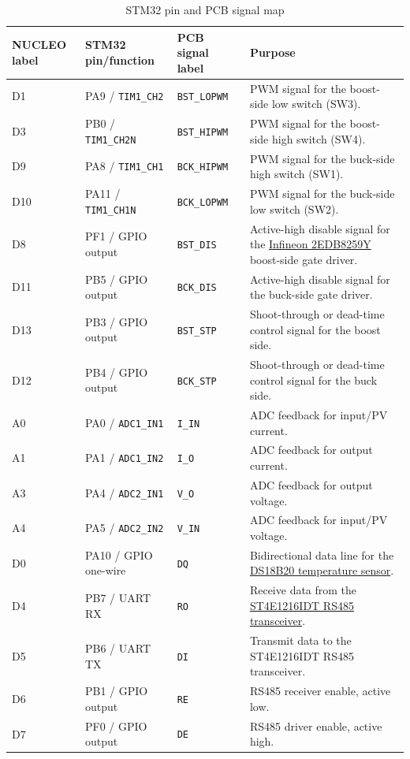 \documentclass[11pt,a4paper]{article}
\newcommand{\code}[1]{\texttt{#1}}
\begin{document}
\begin{table}[H]
  \centering
  \footnotesize
  \caption{STM32 pin and PCB signal map}
  \label{tab:firmware-interface}
  \begin{tabularx}{\textwidth}{@{}L{0.12\textwidth} L{0.21\textwidth} L{0.20\textwidth} Y@{}}
    \toprule
    \textbf{NUCLEO label} & \textbf{STM32 pin/function} & \textbf{PCB signal label} & \textbf{Purpose} \\
    \midrule
    D1  & PA9 / \code{TIM1\_CH2} & \code{BST\_LOPWM} & PWM signal for the boost-side low switch (SW3). \\
    D3  & PB0 / \code{TIM1\_CH2N} & \code{BST\_HIPWM} & PWM signal for the boost-side high switch (SW4). \\
    D9  & PA8 / \code{TIM1\_CH1} & \code{BCK\_HIPWM} & PWM signal for the buck-side high switch (SW1). \\
    D10 & PA11 / \code{TIM1\_CH1N} & \code{BCK\_LOPWM} & PWM signal for the buck-side low switch (SW2). \\
    D8  & PF1 / GPIO output & \code{BST\_DIS} & Active-high disable signal for the \href{https://www.infineon.com/part/2EDB8259Y}{Infineon 2EDB8259Y} boost-side gate driver. \\
    D11 & PB5 / GPIO output & \code{BCK\_DIS} & Active-high disable signal for the buck-side gate driver. \\
    D13 & PB3 / GPIO output & \code{BST\_STP} & Shoot-through or dead-time control signal for the boost side. \\
    D12 & PB4 / GPIO output & \code{BCK\_STP} & Shoot-through or dead-time control signal for the buck side. \\
    A0  & PA0 / \code{ADC1\_IN1} & \code{I\_IN} & ADC feedback for input/PV current. \\
    A1  & PA1 / \code{ADC1\_IN2} & \code{I\_O} & ADC feedback for output current. \\
    A3  & PA4 / \code{ADC2\_IN1} & \code{V\_O} & ADC feedback for output voltage. \\
    A4  & PA5 / \code{ADC2\_IN2} & \code{V\_IN} & ADC feedback for input/PV voltage. \\
    D0  & PA10 / GPIO one-wire & \code{DQ} & Bidirectional data line for the \href{https://www.analog.com/media/en/technical-documentation/data-sheets/ds18b20.pdf}{DS18B20 temperature sensor}. \\
    D4  & PB7 / UART RX & \code{RO} & Receive data from the \href{https://www.st.com/resource/en/datasheet/st4e1216.pdf}{ST4E1216IDT RS485 transceiver}. \\
    D5  & PB6 / UART TX & \code{DI} & Transmit data to the ST4E1216IDT RS485 transceiver. \\
    D6  & PB1 / GPIO output & \code{RE} & RS485 receiver enable, active low. \\
    D7  & PF0 / GPIO output & \code{DE} & RS485 driver enable, active high. \\
    \bottomrule
  \end{tabularx}
\end{table}
\end{document}
